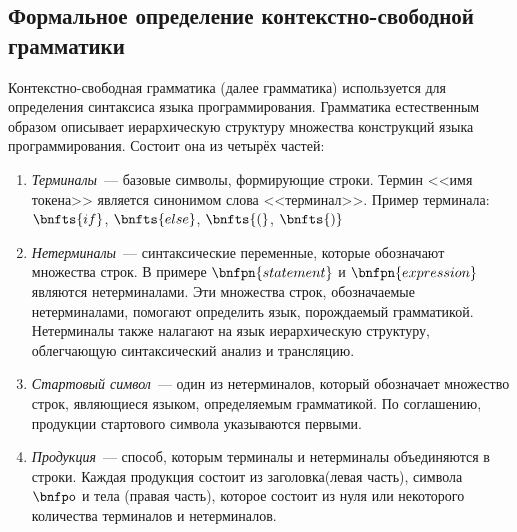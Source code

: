 \subsection{Формальное определение контекстно-свободной грамматики} \label{sub114}

Контекстно-свободная грамматика (далее грамматика) используется для определения синтаксиса языка программирования. Грамматика естественным образом описывает иерархическую структуру множества конструкций языка программирования. Состоит она из четырёх частей:

\begin{enumerate} 
	\item{\textit{Терминалы}~--- базовые символы, формирующие строки. Термин <<имя токена>> является синонимом слова <<терминал>>. Пример терминала: $\bnfts{if}$, $\bnfts{else}$, $\bnfts{(}$, $\bnfts{)}$}
	\item{\textit{Нетерминалы}~--- синтаксические переменные, которые обозначают множества строк. В примере $\bnfpn{statement}$ и $\bnfpn{expression}$ являются нетерминалами. Эти множества строк, обозначаемые нетерминалами, помогают определить язык, порождаемый грамматикой. Нетерминалы также налагают на язык иерархическую структуру, облегчающую синтаксический анализ и трансляцию.}
	\item{\textit{Стартовый символ}~--- один из нетерминалов, который обозначает множество строк, являющиеся языком, определяемым грамматикой. По соглашению, продукции стартового символа указываются первыми.}
	\item{\textit{Продукция}~--- способ, которым терминалы и нетерминалы объединяются в строки. Каждая продукция состоит из заголовка(левая часть), символа $\bnfpo$ и тела (правая часть), которое состоит из нуля или некоторого количества терминалов и нетерминалов.}
\end{enumerate}


\begin{bnf*}
	{ \bnfsp \bnfts{+} \bnfsp {}}\\
	{ \bnfsp \bnfts{-} \bnfsp {}}\\
	{}\\
	{ \bnfsp \bnfts{*} \bnfsp {}}\\
	{ \bnfsp \bnfts{/} \bnfsp {}}\\
	{}\\
	{\bnfts{(} \bnfsp {} \bnfts{)}}\\
\end{bnf*}